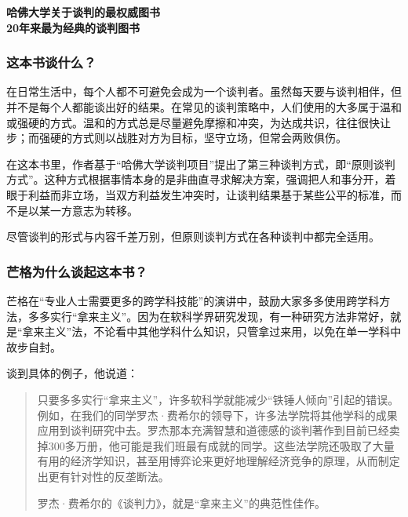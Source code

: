 \cleardoublepage
{}


\begin{BookSummaryBox}
{\centering \textbf{哈佛大学关于谈判的最权威图书\\  20年来最为经典的谈判图书}\par}
\end{BookSummaryBox}

\subsubsection*{这本书谈什么？}

在日常生活中，每个人都不可避免会成为一个谈判者。虽然每天要与谈判相伴，但并不是每个人都能谈出好的结果。在常见的谈判策略中，人们使用的大多属于温和或强硬的方式。温和的方式总是尽量避免摩擦和冲突，为达成共识，往往很快让步；而强硬的方式则以战胜对方为目标，坚守立场，但常会两败俱伤。
\par

在这本书里，作者基于“哈佛大学谈判项目”提出了第三种谈判方式，即“原则谈判方式”。这种方式根据事情本身的是非曲直寻求解决方案，强调把人和事分开，着眼于利益而非立场，当双方利益发生冲突时，让谈判结果基于某些公平的标准，而不是以某一方意志为转移。
\par

尽管谈判的形式与内容千差万别，但原则谈判方式在各种谈判中都完全适用。
\par

\subsubsection*{芒格为什么谈起这本书？}

芒格在“专业人士需要更多的跨学科技能”的演讲中，鼓励大家多多使用跨学科方法，多多实行“拿来主义”。因为在软科学界研究发现，有一种研究方法非常好，就是“拿来主义”法，不论看中其他学科什么知识，只管拿过来用，以免在单一学科中故步自封。
\par

谈到具体的例子，他说道：
\par

\begin{quotation}
只要多多实行“拿来主义”，许多软科学就能减少“铁锤人倾向”引起的错误。例如，在我们的同学罗杰·费希尔的领导下，许多法学院将其他学科的成果应用到谈判研究中去。罗杰那本充满智慧和道德感的谈判著作到目前已经卖掉300多万册，他可能是我们班最有成就的同学。这些法学院还吸取了大量有用的经济学知识，甚至用博弈论来更好地理解经济竞争的原理，从而制定出更有针对性的反垄断法。
\par

罗杰·费希尔的《谈判力》，就是“拿来主义”的典范性佳作。
\par
\end{quotation}

